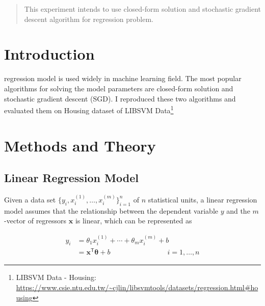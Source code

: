 \documentclass[journal, a4paper]{IEEEtran}
\begin{document}
\begin{abstract}
    This experiment intends to use closed-form solution and stochastic gradient descent algorithm for regression problem.
\end{abstract}

\section{Introduction}
     regression model is used widely in machine learning field. The most popular algorithms for solving the model parameters are closed-form solution and stochastic gradient descent (SGD). I reproduced these two algorithms and evaluated them on Housing dataset of LIBSVM Data\footnote{LIBSVM Data - Housing: \url{https://www.csie.ntu.edu.tw/~cjlin/libsvmtools/datasets/regression.html\#housing}}

\section{Methods and Theory}
\subsection{Linear Regression Model}

Given a data set $\{y_i, x_i^{(1)}, \ldots, x_i^{(m)}\}_{i=1}^n$ of $n$ statistical units, a linear regression model assumes that the relationship between the dependent variable $y$ and the $m$-vector of regressors $\mathbf{x}$ is linear, which can be represented as

\begin{equation}
    \begin{split}
        y_i & = \theta_1 x_i^{(1)} + \cdots + \theta_m x_i^{(m)} + b \\ 
            & = \mathbf{x}^\mathsf{T}\boldsymbol{\theta} + b \qquad\qquad\qquad\qquad i = 1,\ldots,n    
    \end{split}
\end{equation}
\end{document}
